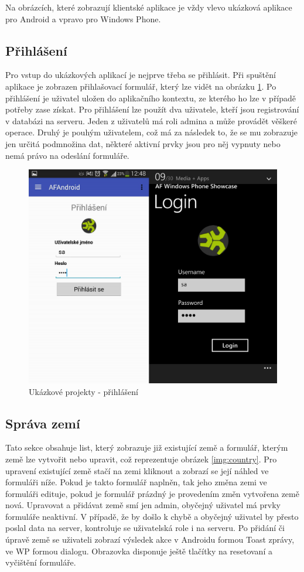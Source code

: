 Na obrázcích, které zobrazují klientské aplikace je vždy vlevo ukázková aplikace pro Android a vpravo pro Windows Phone.

\subsection{Přihlášení}
Pro vstup do ukázkových aplikací je nejprve třeba se přihlásit. Při spuštění aplikace je zobrazen přihlašovací formulář, který lze vidět na obrázku \ref{img:login}. Po přihlášení je uživatel uložen do aplikačního kontextu, ze kterého ho lze v případě potřeby zase získat. Pro přihlášení lze použít dva uživatele, kteří jsou registrování v databázi na serveru. Jeden z uživatelů má roli admina a může provádět věškeré operace. Druhý je pouhým uživatelem, což má za následek to, že se mu zobrazuje jen určitá podmnožina dat, některé aktivní prvky jsou pro něj vypnuty nebo nemá právo na odeslání formuláře.

\begin{figure}[h!]
\centering
\includegraphics[width=0.7\linewidth]{figures/screenshots/Login}
\caption{Ukázkové projekty - přihlášení}  
\label{img:login}
\end{figure}

\subsection{Správa zemí}
Tato sekce obsahuje list, který zobrazuje již existující země a formulář, kterým země lze vytvořit nebo upravit, což reprezentuje obrázek \ref{img:country}. Pro upravení existující země stačí na zemi kliknout a zobrazí se její náhled ve formuláři níže. Pokud je takto formulář naplněn, tak jeho změna zemi ve formuláři edituje, pokud je formulář prázdný je provedením změn vytvořena země nová. Upravovat a přidávat země smí jen admin, obyčejný uživatel má prvky formuláře neaktivní. V případě, že by došlo k chybě a obyčejný uživatel by přesto poslal data na server, kontroluje se uživatelská role i na serveru. Po přidání či úpravě země se uživateli zobrazí výsledek akce v Androidu formou Toast zprávy, ve WP formou dialogu. Obrazovka disponuje ještě tlačítky na resetovaní a vyčištění formuláře.
